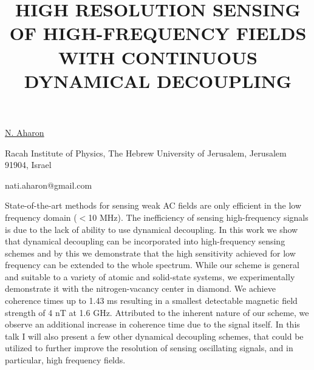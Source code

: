 \title{HIGH RESOLUTION SENSING OF HIGH-FREQUENCY FIELDS WITH CONTINUOUS DYNAMICAL DECOUPLING}

\underline{N. Aharon} 

{\normalsize{\vspace{-4mm}
Racah Institute of Physics, The Hebrew University of Jerusalem, Jerusalem 91904, Israel

\email nati.aharon@gmail.com}}

State-of-the-art methods for sensing weak AC fields are only efficient in the low frequency domain ($<$10 MHz). The inefficiency of sensing high-frequency signals is due to the lack of ability to use dynamical decoupling. In this work we show that dynamical decoupling can be incorporated into high-frequency sensing schemes and by this we demonstrate that the high sensitivity achieved for low frequency can be extended to the whole spectrum. While our scheme is general and suitable to a variety of atomic and solid-state systems, we experimentally demonstrate it with the nitrogen-vacancy center in diamond. We achieve coherence times up to 1.43 ms resulting in a smallest detectable magnetic field strength of 4 nT at 1.6 GHz. Attributed to the inherent nature of our scheme, we observe an additional increase in coherence time due to the signal itself. In this talk I will also present a few other dynamical decoupling schemes, that could be utilized to further improve the resolution of sensing oscillating signals, and in particular, high frequency fields.

\vspace{\baselineskip} 